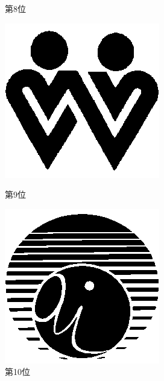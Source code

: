 \begin{figure}[htbp]
\begin{flushright}
\begin{minipage}[t]{0.16\hsize}
      \centering
      \caption{第8位}
      \label{graph:43}
    \end{minipage}
    \begin{minipage}[t]{0.16\hsize}
      \includegraphics[scale=0.3]{img/10.bmp}
      \centering
      \caption{第9位}
      \label{graph:44}
    \end{minipage}
    \begin{minipage}[t]{0.16\hsize}
      \includegraphics[scale=0.3]{img/6.bmp}
      \centering
      \caption{第10位}
      \label{graph:45}
    \end{minipage}
  \end{flushright}
\end{figure}

